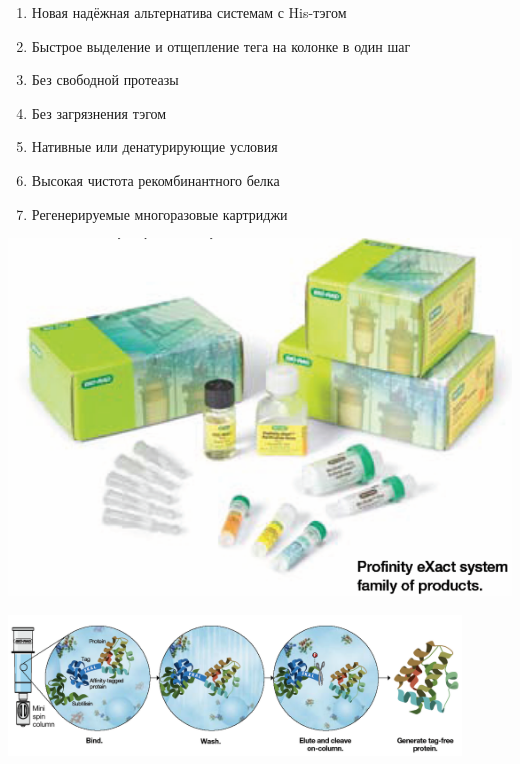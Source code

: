 \large{
\begin{minipage}[t]{0.45\textwidth}
	\vspace{0pt}
\begin{enumerate}[noitemsep, topsep=0em, partopsep=1em, leftmargin=0em]
\item[\Checkmark] Новая надёжная альтернатива системам с His-тэгом
\item[\Checkmark] Быстрое выделение и отщепление тега на колонке в один шаг
\item[\Checkmark] Без свободной протеазы
\item[\Checkmark] Без загрязнения тэгом
\item[\Checkmark] Нативные или денатурирующие условия
\item[\Checkmark] Высокая чистота рекомбинантного белка
\item[\Checkmark] Регенерируемые многоразовые картриджи
\end{enumerate}

\end{minipage}
\begin{minipage}[t]{0.35\textwidth}
	\vspace{5em}\raggedright
	\includegraphics[width=1.3\textwidth]{images/exact1_color.png}
\end{minipage}

\begin{center}

\includegraphics[width=0.9\textwidth]{images/exact2_color.png}


\end{center}}
